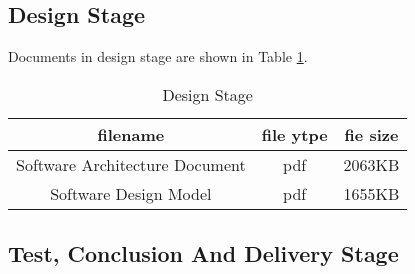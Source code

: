 \documentclass[10pt]{article}
\begin{document}
\subsection{Design Stage}
Documents in design stage are shown in Table \ref{Design Stage}.
\begin{table}[htb]
	\centering

	\begin{tabular}{c|c|c} 
		\hline 
		filename&file ytpe&fie size\\
		\hline  
Software Architecture Document&pdf&2063KB\\
\hline
Software Design Model&pdf&1655KB\\
\hline
\end{tabular}
\caption{Design Stage}
\label{Design Stage}
\end{table}

\subsection{Test, Conclusion And Delivery Stage}
\end{document}

